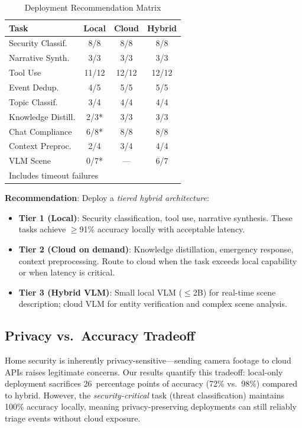 \documentclass[conference]{IEEEtran}
\begin{document}
\begin{table}[h]
\centering
\caption{Deployment Recommendation Matrix}
\label{tab:recommend}
\small
\begin{tabular}{p{2.3cm}ccc}
\toprule
\textbf{Task} & \textbf{Local} & \textbf{Cloud} & \textbf{Hybrid} \\
\midrule
Security Classif. & 8/8 & 8/8 & 8/8 \\
Narrative Synth. & 3/3 & 3/3 & 3/3 \\
Tool Use & 11/12 & 12/12 & 12/12 \\
Event Dedup. & 4/5 & 5/5 & 5/5 \\
Topic Classif. & 3/4 & 4/4 & 4/4 \\
Knowledge Distill. & 2/3* & 3/3 & 3/3 \\
Chat Compliance & 6/8* & 8/8 & 8/8 \\
Context Preproc. & 2/4 & 3/4 & 4/4 \\
VLM Scene & 0/7* & --- & 6/7 \\
\bottomrule
\multicolumn{4}{l}{\footnotesize *Includes timeout failures} \\
\end{tabular}
\end{table}

\textbf{Recommendation}: Deploy a \emph{tiered hybrid architecture}:
\begin{itemize}[nosep]
    \item \textbf{Tier 1 (Local)}: Security classification, tool use,
    narrative synthesis. These tasks achieve $\geq$91\% accuracy locally
    with acceptable latency.
    \item \textbf{Tier 2 (Cloud on demand)}: Knowledge distillation,
    emergency response, context preprocessing. Route to cloud when
    the task exceeds local capability or when latency is critical.
    \item \textbf{Tier 3 (Hybrid VLM)}: Small local VLM ($\leq$2B) for
    real-time scene description; cloud VLM for entity verification
    and complex scene analysis.
\end{itemize}

\subsection{Privacy vs.\ Accuracy Tradeoff}

Home security is inherently privacy-sensitive---sending camera footage
to cloud APIs raises legitimate concerns. Our results quantify this
tradeoff: local-only deployment sacrifices 26~percentage points of
accuracy (72\% vs.\ 98\%) compared to hybrid. However, the
\emph{security-critical} task (threat classification) maintains 100\%
accuracy locally, meaning privacy-preserving deployments can still
reliably triage events without cloud exposure.
\end{document}
